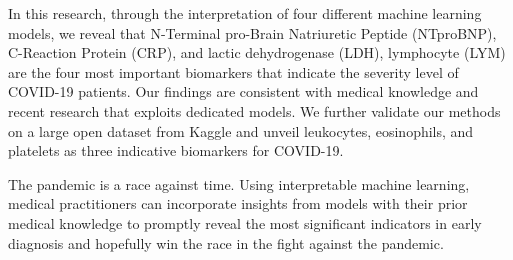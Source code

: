 In this research, through the interpretation of four different machine learning models, we reveal that N-Terminal pro-Brain Natriuretic Peptide (NTproBNP), C-Reaction Protein (CRP), and lactic dehydrogenase (LDH), lymphocyte (LYM) are the four most important biomarkers that indicate the severity level of COVID-19 patients. Our findings are consistent with medical knowledge and recent research that exploits dedicated models. We further validate our methods on a large open dataset from Kaggle and unveil leukocytes, eosinophils, and platelets as three indicative biomarkers for COVID-19.

The pandemic is a race against time. Using interpretable machine learning, medical practitioners can incorporate insights from models with their prior medical knowledge to promptly reveal the most significant indicators in early diagnosis and hopefully win the race in the fight against the pandemic.


